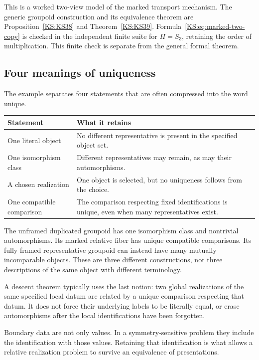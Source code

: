 This is a worked two-view model of the marked transport mechanism. The generic groupoid construction and its equivalence theorem are Proposition~\ref{KS:KS38} and Theorem~\ref{KS:KS39}. Formula~\eqref{KS:eq:marked-two-copy} is checked in the independent finite suite for \(H=S_3\), retaining the order of multiplication. This finite check is separate from the general formal theorem.

\subsection{Four meanings of uniqueness}
The example separates four statements that are often compressed into the word unique.
\begin{center}
\begin{tabularx}{\linewidth}{@{}p{.28\linewidth}X@{}}
\toprule
Statement & What it retains\\
\midrule
One literal object & No different representative is present in the specified object set.\\
One isomorphism class & Different representatives may remain, as may their automorphisms.\\
A chosen realization & One object is selected, but no uniqueness follows from the choice.\\
One compatible comparison & The comparison respecting fixed identifications is unique, even when many representatives exist.\\
\bottomrule
\end{tabularx}
\end{center}
The unframed duplicated groupoid has one isomorphism class and nontrivial automorphisms. Its marked relative fiber has unique compatible comparisons. Its fully framed representative groupoid can instead have many mutually incomparable objects. These are three different constructions, not three descriptions of the same object with different terminology.

A descent theorem typically uses the last notion: two global realizations of the same specified local datum are related by a unique comparison respecting that datum. It does not force their underlying labels to be literally equal, or erase automorphisms after the local identifications have been forgotten.

\begin{insight}
Boundary data are not only values. In a symmetry-sensitive problem they include the identification with those values. Retaining that identification is what allows a relative realization problem to survive an equivalence of presentations.
\end{insight}



